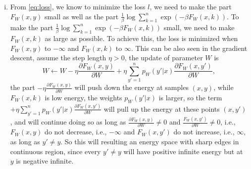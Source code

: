 \documentclass[10pt,a4paper]{article}
\theoremstyle{dotlessP}
\begin{document}
\begin{enumerate}[(i)]
	\item From \eqref{eq:loss}, we know to minimize the loss $l$, we need to make the part $F_W(x,y)$ small as well as the part $ \frac{1}{\beta}\log \sum\limits_{k=1}^{n}\exp(-\beta F_W(x,k)) $. To make the part $ \frac{1}{\beta}\log \sum\limits_{k=1}^{n}\exp(-\beta F_W(x,k)) $ small, we need to make $F_W(x,k)$ as large as possible. To achieve this, the loss is minimized when $F_W(x,y)$ to $-\infty$ and $F_W(x,k)$ to $\infty$. This can be also seen in the gradient descent, assume the step length $\eta>0$, the update of parameter $W$ is 
	\begin{equation}
	W \leftarrow W - \eta \frac{\partial F_W(x,y)}{\partial W} + \eta  \sum\limits_{y'=1}^{n}  p_W(y'|x) \frac{\partial F_W(x,y')}{\partial W},
	\end{equation}
	the part $- \eta \frac{\partial F_W(x,y)}{\partial W}$ will push down the energy at samples $(x,y)$, while $F_W(x, k)$ is low energy, the weights $p_W(y'|x)$ is larger, so the term $+ \eta  \sum\limits_{y'=1}^{n}  p_W(y'|x) \frac{\partial F_W(x,y')}{\partial W}$ will pull up the energy at these points $(x,y')$, and will continue doing so as long as $\frac{\partial F_W(x,y)}{\partial W} \neq 0$ and $\frac{F_W(x,y')}{\partial W} \neq 0$, i.e., $F_W(x,y)$ do not decrease, i.e., $-\infty$ and $F_W(x,y')$ do not increase, i.e., $\infty$, as long as $y'\neq y$. So this will resulting an energy space with sharp edges in continuous region, since every $y'\neq y$ will have positive infinite energy but at $y$ is negative infinite.
	
\end{enumerate}
\end{document}
